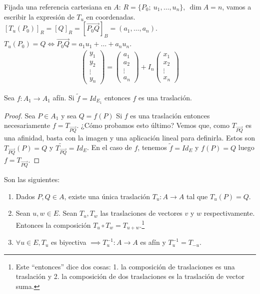 \documentclass[14pt]{book}
\begin{document}
Fijada una referencia cartesiana en $A$: $R = \{P_0;\ u_1, \dots, u_n\},\ \dim A = n$, vamos a escribir la expresión de $T_u$ en coordenadas. $[T_u(P_0)]_R = [Q]_R = [\overrightarrow{P_0 Q}]_B = (a_1, \dots, a_n)$. $T_u(P_0) = Q \iff \overrightarrow{P_0 Q} = a_1 u_1 + \dots + a_n u_n$.
\begin{align*}
	\left(\begin{array}{c}
	y_1 \\ y_2 \\ \vdots \\ y_n
	\end{array}
	\right) = 
	\left(
	\begin{array}{c}
	a_1 \\ a_2 \\ \vdots \\ a_n
	\end{array}
	\right) + I_n \left(
	\begin{array}{c}
	x_1 \\ x_2 \\ \vdots \\ x_n
	\end{array}
	\right)
\end{align*}

\begin{pro}
	Sea $f: A_1 \to A_1$ afín. Si $\tilde{f} = Id_{E_1}$ entonces $f$ es una traslación.
\end{pro}

\begin{proof}
	Sea $P \in A_1$ y sea $Q = f(P)$ Si $f$ es una traslación entonces necesariamente $f = T_{\overrightarrow{PQ}}$. ¿Cómo probamos esto último? Vemos que, como $T_{\overrightarrow{PQ}}$ es una afinidad, basta con la imagen y una aplicación lineal para definirla. Estos son $T_{\overrightarrow{PQ}}(P) = Q$ y $\widetilde{T_{\overrightarrow{PQ}}} = Id_E$. En el caso de $f$, tenemos $\tilde{f} = Id_E$ y $f(P) = Q$ luego $f = T_{\overrightarrow{PQ}}$.
\end{proof}

\begin{tm}
	Son las siguientes:
	\begin{enumerate}
		\item Dados $P, Q \in A$, existe una única traslación $T_u : A \to A$ tal que $T_u(P) = Q$.
		\item Sean $u, w \in E$. Sean $T_u, T_w$ las traslaciones de vectores $v$ y $w$ respectivamente. Entonces la composición $T_u \circ T_w = T_{u + w}$.\footnote{Este ``entonces'' dice dos cosas: 1. la composición de traslaciones es una traslación y 2. la composición de dos traslaciones es la traslación de vector suma.}
		\item $\forall u \in E, T_u$ es biyectiva $\implies T_u^{-1} : A \to A$ es afín y $T_u^{-1} = T_{-u}$.
	\end{enumerate}
\end{tm}
\end{document}
